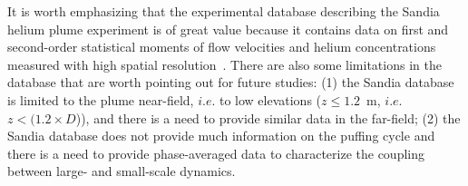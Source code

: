 It is worth emphasizing that the experimental database describing the Sandia helium plume experiment is of great value because it contains data on first and second-order statistical moments of flow velocities and helium concentrations measured with high spatial resolution~\cite{Case1_EXP}. There are also some limitations in the database that are worth pointing out for future studies: (1) the Sandia database is limited to the plume near-field, $i.e.$ to low elevations ($z \leq 1.2$~m, $i.e.$ $z < (1.2 \times D$)), and there is a need to provide similar data in the far-field; (2) the Sandia database does not provide much information on the puffing cycle and there is a need to provide phase-averaged data to characterize the coupling between large- and small-scale dynamics.

